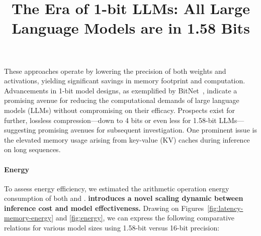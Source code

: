 \title{The Era of 1-bit LLMs: All Large Language Models are in 1.58 Bits}
These approaches operate by lowering the precision of both weights and activations, yielding significant savings in memory footprint and computation. Advancements in 1-bit model designs, as exemplified by BitNet~\cite{bitnet}, indicate a promising avenue for reducing the computational demands of large language models (LLMs) without compromising on their efficacy. Prospects exist for further, lossless compression—down to 4 bits or even less for 1.58-bit LLMs—suggesting promising avenues for subsequent investigation. One prominent issue is the elevated memory usage arising from key-value (KV) caches during inference on long sequences. \paragraph{Energy}

To assess energy efficiency, we estimated the arithmetic operation energy consumption of both  and . \textbf{ introduces a novel scaling dynamic between inference cost and model effectiveness.} Drawing on Figures~\ref{fig:latency-memory-energy} and \ref{fig:energy}, we can express the following comparative relations for various model sizes using 1.58-bit versus 16-bit precision:

